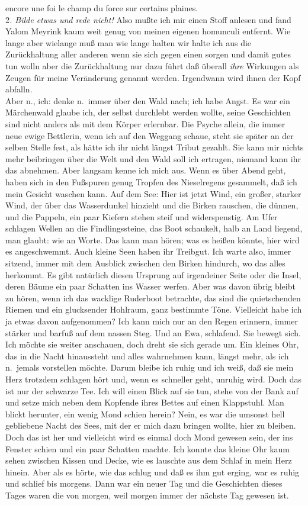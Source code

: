 \documentclass[
]{article}
\begin{document}
encore une foi le champ du force sur certains plaines.\\
2\emph{. Bilde etwas und rede nicht!} Also mußte ich mir einen Stoff
anlesen und fand Yalom Meyrink kaum weit genug von meinen eigenen
homunculi entfernt. Wie lange aber wielange muß man wie lange halten wir
halte ich aus die Zurückhaltung aller anderen wenn sie sich gegen einen
sorgen und damit gutes tun wolln aber die Zurückhaltung nur dazu führt
daß überall \emph{ihre} Wirkungen als Zeugen für meine Veränderung
genannt werden. Irgendwann wird ihnen der Kopf abfalln.\\
Aber n., ich: denke n.~immer über den Wald nach; ich habe Angst. Es war
ein Märchenwald glaube ich, der selbst durchlebt werden wollte, seine
Geschichten sind nicht anders als mit dem Körper erlernbar. Die Psyche
allein, die immer neue ewige Bettlerin, wenn ich auf den Weggang schaue,
steht sie später an der selben Stelle fest, als hätte ich ihr nicht
längst Tribut gezahlt. Sie kann mir nichts mehr beibringen über die Welt
und den Wald soll ich ertragen, niemand kann ihr das abnehmen. Aber
langsam kenne ich mich aus. Wenn es über Abend geht, haben sich in den
Fußspuren genug Tropfen des Nieselregens gesammelt, daß ich mein Gesicht
waschen kann. Auf dem See: Hier ist jetzt Wind, ein großer, starker
Wind, der über das Wasserdunkel hinzieht und die Birken rauschen, die
dünnen, und die Pappeln, ein paar Kiefern stehen steif und
widerspenstig. Am Ufer schlagen Wellen an die Findlingssteine, das Boot
schaukelt, halb an Land liegend, man glaubt: wie an Worte. Das kann man
hören; was es heißen könnte, hier wird es angeschwemmt. Auch kleine Seen
haben ihr Treibgut. Ich warte also, immer sitzend, immer mit dem
Ausblick zwischen den Birken hindurch, wo das alles herkommt. Es gibt
natürlich diesen Ursprung auf irgendeiner Seite oder die Insel, deren
Bäume ein paar Schatten ins Wasser werfen. Aber was davon übrig bleibt
zu hören, wenn ich das wacklige Ruderboot betrachte, das sind die
quietschenden Riemen und ein glucksender Hohlraum, ganz bestimmte Töne.
Vielleicht habe ich ja etwas davon aufgenommen? Ich kann mich nur an den
Regen erinnern, immer stärker und barfuß auf dem nassen Steg. Und an
Ewa, schlafend. Sie bewegt sich. Ich möchte sie weiter anschauen, doch
dreht sie sich gerade um. Ein kleines Ohr, das in die Nacht hinaussteht
und alles wahrnehmen kann, längst mehr, als ich n.~jemals vorstellen
möchte. Darum bleibe ich ruhig und ich weiß, daß sie mein Herz trotzdem
schlagen hört und, wenn es schneller geht, unruhig wird. Doch das ist
nur der schwarze Tee. Ich will einen Blick auf sie tun, stehe von der
Bank auf und setze mich neben dem Kopfende ihres Bettes auf einen
Klappstuhl. Man blickt herunter, ein wenig Mond schien herein? Nein, es
war die umsonst hell gebliebene Nacht des Sees, mit der er mich dazu
bringen wollte, hier zu bleiben. Doch das ist her und vielleicht wird es
einmal doch Mond gewesen sein, der ins Fenster schien und ein paar
Schatten machte. Ich konnte das kleine Ohr kaum sehen zwischen Kissen
und Decke, wie es lauschte aus dem Schlaf in mein Herz hinein. Aber als
es hörte, wie das schlug und daß es ihm gut erging, war es ruhig und
schlief bis morgens. Dann war ein neuer Tag und die Geschichten dieses
Tages waren die von morgen, weil morgen immer der nächste Tag gewesen
ist.
\end{document}

